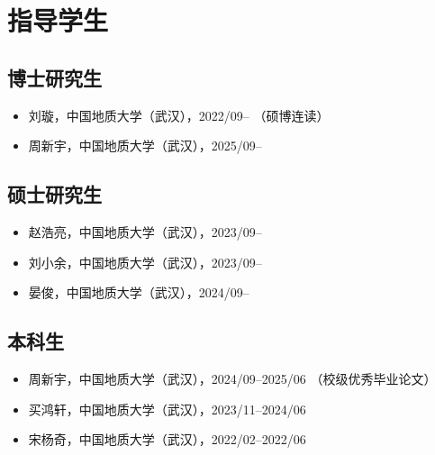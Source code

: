 \section{指导学生}

\subsection{博士研究生}
\begin{itemize}
\item 刘璇，中国地质大学（武汉），2022/09-- （硕博连读）
\item 周新宇，中国地质大学（武汉），2025/09--
\end{itemize}

\subsection{硕士研究生}
\begin{itemize}
\item 赵浩亮，中国地质大学（武汉），2023/09--
\item 刘小余，中国地质大学（武汉），2023/09--
\item 晏俊，中国地质大学（武汉），2024/09--
\end{itemize}

\subsection{本科生}
\begin{itemize}
\item 周新宇，中国地质大学（武汉），2024/09--2025/06 （校级优秀毕业论文）
\item 买鸿轩，中国地质大学（武汉），2023/11--2024/06
\item 宋杨奇，中国地质大学（武汉），2022/02--2022/06
\end{itemize}
